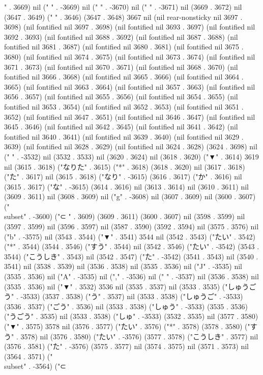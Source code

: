 " . 3669) nil ("
" . -3669) nil (" " . -3670) nil (" " . -3671) nil (3669 . 3672) nil (3647 . 3649) (" " . 3646) (3647 . 3648) 3667 nil (nil rear-nonsticky nil 3697 . 3698) (nil fontified nil 3697 . 3698) (nil fontified nil 3693 . 3697) (nil fontified nil 3692 . 3693) (nil fontified nil 3688 . 3692) (nil fontified nil 3687 . 3688) (nil fontified nil 3681 . 3687) (nil fontified nil 3680 . 3681) (nil fontified nil 3675 . 3680) (nil fontified nil 3674 . 3675) (nil fontified nil 3673 . 3674) (nil fontified nil 3671 . 3673) (nil fontified nil 3670 . 3671) (nil fontified nil 3668 . 3670) (nil fontified nil 3666 . 3668) (nil fontified nil 3665 . 3666) (nil fontified nil 3664 . 3665) (nil fontified nil 3663 . 3664) (nil fontified nil 3657 . 3663) (nil fontified nil 3656 . 3657) (nil fontified nil 3655 . 3656) (nil fontified nil 3654 . 3655) (nil fontified nil 3653 . 3654) (nil fontified nil 3652 . 3653) (nil fontified nil 3651 . 3652) (nil fontified nil 3647 . 3651) (nil fontified nil 3646 . 3647) (nil fontified nil 3645 . 3646) (nil fontified nil 3642 . 3645) (nil fontified nil 3641 . 3642) (nil fontified nil 3640 . 3641) (nil fontified nil 3639 . 3640) (nil fontified nil 3629 . 3639) (nil fontified nil 3628 . 3629) (nil fontified nil 3624 . 3628) (3624 . 3698) nil (" " . -3532) nil (3532 . 3533) nil (3620 . 3624) nil (3618 . 3620) ("▼" . 3614) 3619 nil (3615 . 3618) ("なりた" . 3615) ("*" . 3618) (3618 . 3620) nil (3617 . 3618) ("た" . 3617) nil (3615 . 3618) ("なり" . -3615) (3616 . 3617) ("か" . 3616) nil (3615 . 3617) ("な" . -3615) (3614 . 3616) nil (3613 . 3614) nil (3610 . 3611) nil (3609 . 3611) nil (3608 . 3609) nil ("g" . -3608) nil (3607 . 3609) nil (3600 . 3607) ("\\subset" . -3600) ("⊂
" . 3609) (3609 . 3611) (3600 . 3607) nil (3598 . 3599) nil (3597 . 3599) nil (3596 . 3597) nil (3587 . 3590) (3592 . 3594) nil (3575 . 3576) nil ("b" . -3575) nil (3543 . 3544) ("▼" . 3541) 3544 nil (3542 . 3543) ("たい" . 3542) ("*" . 3544) (3544 . 3546) ("すう" . 3544) nil (3542 . 3546) ("たい" . -3542) (3543 . 3544) ("こうしき" . 3543) nil (3542 . 3547) ("た" . -3542) (3541 . 3543) nil (3540 . 3541) nil (3538 . 3539) nil (3536 . 3538) nil (3535 . 3536) nil ("J" . -3535) nil (3535 . 3536) nil ("A" . -3535) nil ("," . -3536) nil (" " . -3537) nil (3536 . 3538) nil (3535 . 3536) nil ("▼" . 3532) 3536 nil (3535 . 3537) nil (3533 . 3535) ("しゅうごう" . -3533) (3537 . 3538) ("う" . 3537) nil (3533 . 3538) ("しゅうご" . -3533) (3536 . 3537) ("ごう" . 3536) nil (3533 . 3538) ("しゅう" . -3533) (3535 . 3536) ("うごう" . 3535) nil (3533 . 3538) ("しゅ" . -3533) (3532 . 3535) nil (3577 . 3580) ("▼" . 3575) 3578 nil (3576 . 3577) ("たい" . 3576) ("*" . 3578) (3578 . 3580) ("すう" . 3578) nil (3576 . 3580) ("たい" . -3576) (3577 . 3578) ("こうしき" . 3577) nil (3576 . 3581) ("た" . -3576) (3575 . 3577) nil (3574 . 3575) nil (3571 . 3573) nil (3564 . 3571) ("\\subset" . -3564) ("⊂
